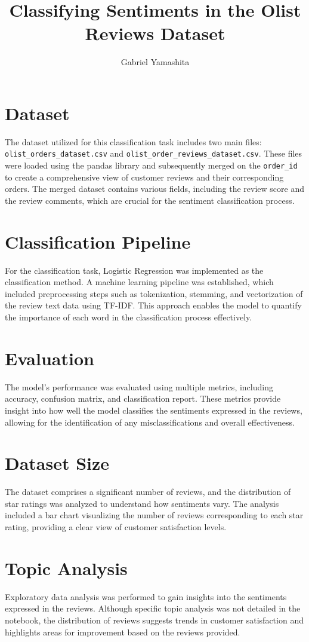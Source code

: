 \documentclass[conference]{IEEEtran}
\title{Classifying Sentiments in the Olist Reviews Dataset}
\author{Gabriel Yamashita}
\begin{document}
\maketitle

\section{Dataset}
The dataset utilized for this classification task includes two main files: \texttt{olist\_orders\_dataset.csv} and \texttt{olist\_order\_reviews\_dataset.csv}. These files were loaded using the pandas library and subsequently merged on the \texttt{order\_id} to create a comprehensive view of customer reviews and their corresponding orders. The merged dataset contains various fields, including the review score and the review comments, which are crucial for the sentiment classification process.

\section{Classification Pipeline}
For the classification task, Logistic Regression was implemented as the classification method. A machine learning pipeline was established, which included preprocessing steps such as tokenization, stemming, and vectorization of the review text data using TF-IDF. This approach enables the model to quantify the importance of each word in the classification process effectively.

\section{Evaluation}
The model's performance was evaluated using multiple metrics, including accuracy, confusion matrix, and classification report. These metrics provide insight into how well the model classifies the sentiments expressed in the reviews, allowing for the identification of any misclassifications and overall effectiveness.

\section{Dataset Size}
The dataset comprises a significant number of reviews, and the distribution of star ratings was analyzed to understand how sentiments vary. The analysis included a bar chart visualizing the number of reviews corresponding to each star rating, providing a clear view of customer satisfaction levels.

\section{Topic Analysis}
Exploratory data analysis was performed to gain insights into the sentiments expressed in the reviews. Although specific topic analysis was not detailed in the notebook, the distribution of reviews suggests trends in customer satisfaction and highlights areas for improvement based on the reviews provided.
\end{document}
